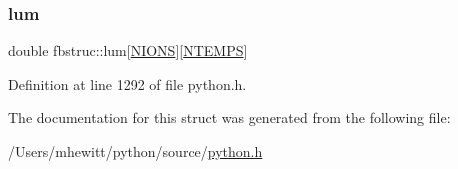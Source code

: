 \mbox{\label{structfbstruc_a9821ceb0012fdc62fd355f8e4c51a437}} 
\subsubsection{\texorpdfstring{lum}{lum}}
{\footnotesize\ttfamily double fbstruc\+::lum\mbox{[}\hyperlink{atomic_8h_ac6a37b9ae25d11bf2521d8ee85c46d79}{N\+I\+O\+NS}\mbox{]}\mbox{[}\hyperlink{python_8h_aed80336ab0bdf84ca8d3c4c333430a7b}{N\+T\+E\+M\+PS}\mbox{]}}



Definition at line 1292 of file python.\+h.



The documentation for this struct was generated from the following file\+:\begin{DoxyCompactItemize}
\item 
/\+Users/mhewitt/python/source/\hyperlink{python_8h}{python.\+h}\end{DoxyCompactItemize}
